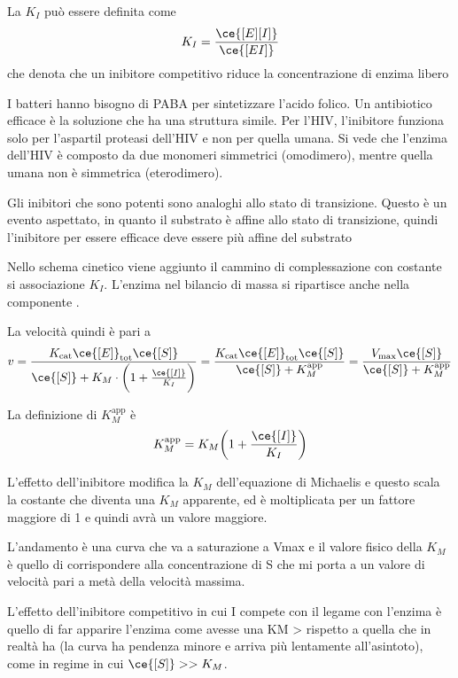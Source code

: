 
La $K_I$ può essere definita come
\[
K_I = \frac{\ce{[E] [I]}}{\ce{[EI]}}
\]
che denota che un inibitore competitivo riduce la concentrazione di enzima libero \ce{[E]}

I batteri hanno bisogno di PABA per sintetizzare l'acido folico. Un antibiotico efficace è la soluzione che ha una struttura simile.
Per l'HIV, l'inibitore funziona solo per l'aspartil proteasi dell'HIV e non per quella umana. Si vede che l'enzima dell'HIV è composto da due monomeri simmetrici (omodimero), mentre quella umana non è simmetrica (eterodimero).

Gli inibitori che sono potenti sono analoghi allo stato di transizione. Questo è un evento aspettato, in quanto il substrato è affine allo stato di transizione, quindi l'inibitore per essere efficace deve essere più affine del substrato

Nello schema cinetico viene aggiunto il cammino di complessazione  con costante si associazione
$K_I$. L’enzima nel bilancio di massa si ripartisce anche nella componente .


La velocità quindi è pari a
\[
  v = \frac{K_{\text{cat}} \ce{[E]}_{\text{tot}} \ce{[S]}}{\ce{[S]} + K_M \cdot \biggl(1 + \frac{\ce{[I]}}{K_I}\biggr)} =  \frac{K_{\text{cat}} \ce{[E]}_{\text{tot}} \ce{[S]}}{\ce{[S]} + K_M^{\text{app}}} = \frac{V_{\text{max}} \ce{[S]}}{\ce{[S]} + K_M^{\text{app}}}
\]

La definizione di $K_M^{\text{app}}$ è
\[
    K_M^{\text{app}} = K_M \biggl(1 + \frac{\ce{[I]}}{K_I}\biggr)
\]

L’effetto dell’inibitore modifica la $K_M$ dell’equazione di Michaelis e questo scala
la costante che diventa una $K_M$ apparente, ed è moltiplicata per un fattore maggiore di 1 e quindi avrà un valore maggiore.

L’andamento è una curva che va a saturazione a Vmax e il valore fisico della $K_M$ è quello di corrispondere alla concentrazione di S che mi porta a un valore di velocità
pari a metà della velocità massima.

L’effetto dell’inibitore competitivo in cui I compete con il legame con l’enzima è quello
di far apparire l’enzima come avesse una KM > rispetto a quella che in realtà ha (la curva ha pendenza minore e arriva più lentamente all’asintoto), come in regime in cui $\ce{[S]} >> K_M$.


